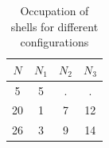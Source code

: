 \documentclass{article}
\begin{document}
\begin{table}[H]
    \centering
    \begin{tabular}{|c|c|c|c|}
        \hline
        $N$& $N_1$ & $N_2$ & $N_3$ \\\hline\hline
        5 & 5 & . & . \\\hline
        20 & 1 & 7 & 12\\\hline
        26 & 3 & 9 & 14 \\\hline
    \end{tabular}
    \caption{Occupation of shells for different configurations}
    \label{tab:2}
\end{table}
\end{document}
